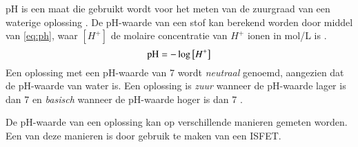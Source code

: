 
pH is een maat die gebruikt wordt voor het meten van de zuurgraad van een waterige oplossing \cite{ck12-chemistry}. De pH-waarde van een stof kan berekend worden door middel van \cref{eq:ph}, waar $[H^+]$ de molaire concentratie van $H^+$ ionen in \unit{\mol/\liter} is \cite{ck12-chemistry}.
\begin{equation}\label{eq:ph}
    \mathrm{pH} = -\log\left[H^+\right]
\end{equation}
Een oplossing met een pH-waarde van 7 wordt \textit{neutraal} genoemd, aangezien dat de pH-waarde van water is. Een oplossing is \textit{zuur} wanneer de pH-waarde lager is dan 7 en \textit{basisch} wanneer de pH-waarde hoger is dan 7 \cite{ck12-chemistry}.

De pH-waarde van een oplossing kan op verschillende manieren gemeten worden. Een van deze manieren is door gebruik te maken van een ISFET.